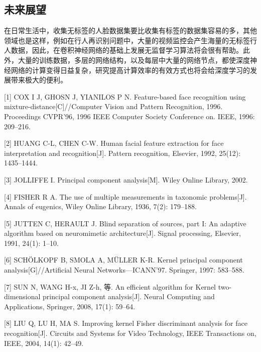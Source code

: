 \documentclass[bachelor,zhspacing]{cqu}  %
\begin{document}
\subsection{未来展望}\label{ux672aux6765ux5c55ux671b}

在日常生活中，收集无标签的人脸数据集要比收集有标签的数据集容易的多，其他领域也是这样，例如在行人再识别问题中，大量的视频监控会产生海量的无标签行人数据，因此，在卷积神经网络的基础上发展无监督学习算法将会很有帮助。此外，大量的训练数据，多层的网络结构，以及每层中大量的网络节点，都使深度神经网络的计算变得日益复杂，研究提高计算效率的有效方式也将会给深度学习的发展带来极大的便利。

\hypertarget{refs}{}
\hypertarget{ref-cox1996feature}{}
{[}1{]} COX I J, GHOSN J, YIANILOS P N. Feature-based face recognition
using mixture-distance{[}C{]}//Computer Vision and Pattern Recognition,
1996. Proceedings CVPR'96, 1996 IEEE Computer Society Conference on.
IEEE, 1996: 209--216.

\hypertarget{ref-huang1992human}{}
{[}2{]} HUANG C-L, CHEN C-W. Human facial feature extraction for face
interpretation and recognition{[}J{]}. Pattern recognition, Elsevier,
1992, 25(12): 1435--1444.

\hypertarget{ref-jolliffe2002principal}{}
{[}3{]} JOLLIFFE I. Principal component analysis{[}M{]}. Wiley Online
Library, 2002.

\hypertarget{ref-fisher1936use}{}
{[}4{]} FISHER R A. The use of multiple measurements in taxonomic
problems{[}J{]}. Annals of eugenics, Wiley Online Library, 1936, 7(2):
179--188.

\hypertarget{ref-jutten1991blind}{}
{[}5{]} JUTTEN C, HERAULT J. Blind separation of sources, part I: An
adaptive algorithm based on neuromimetic architecture{[}J{]}. Signal
processing, Elsevier, 1991, 24(1): 1--10.

\hypertarget{ref-scholkopf1997kernel}{}
{[}6{]} SCHÖLKOPF B, SMOLA A, MÜLLER K-R. Kernel principal component
analysis{[}G{]}//Artificial Neural Networks---ICANN'97. Springer, 1997:
583--588.

\hypertarget{ref-sun2008efficient}{}
{[}7{]} SUN N, WANG H-x, JI Z-h, 等. An efficient algorithm for Kernel
two-dimensional principal component analysis{[}J{]}. Neural Computing
and Applications, Springer, 2008, 17(1): 59--64.

\hypertarget{ref-liu2004improving}{}
{[}8{]} LIU Q, LU H, MA S. Improving kernel Fisher discriminant analysis
for face recognition{[}J{]}. Circuits and Systems for Video Technology,
IEEE Transactions on, IEEE, 2004, 14(1): 42--49.
\end{document}
